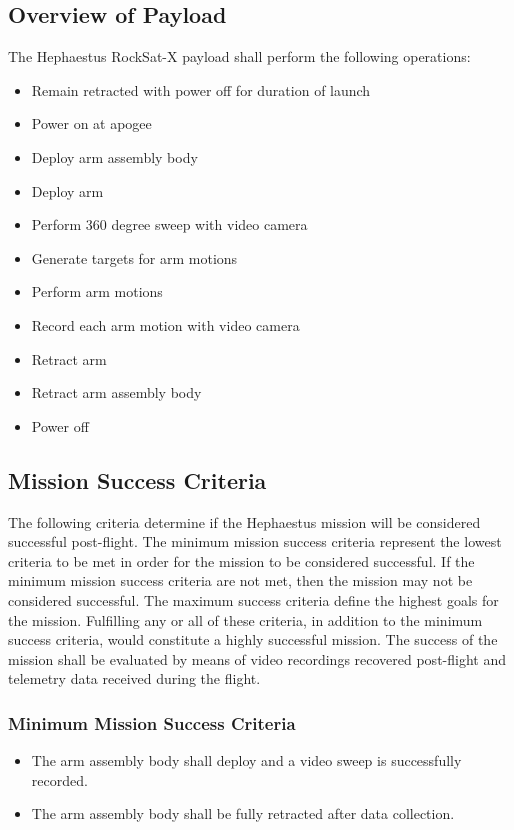 \documentclass[letterpaper,10pt]{article}
\begin{document}
\subsection{Overview of Payload}
The Hephaestus RockSat-X payload shall perform the following operations:
\begin{itemize}
\item{Remain retracted with power off for duration of launch}
\item{Power on at apogee}
\item{Deploy arm assembly body}
\item{Deploy arm}
\item{Perform 360 degree sweep with video camera}
\item{Generate targets for arm motions}
\item{Perform arm motions}
\item{Record each arm motion with video camera}
\item{Retract arm}
\item{Retract arm assembly body}
\item{Power off}
\end{itemize}
\subsection{Mission Success Criteria}
The following criteria determine if the Hephaestus mission will be considered successful post-flight.
The minimum mission success criteria represent the lowest criteria to be met in order for the mission to be considered successful.
If the minimum mission success criteria are not met, then the mission may not be considered successful.
The maximum success criteria define the highest goals for the mission.
Fulfilling any or all of these criteria, in addition to the minimum success criteria, would constitute a highly successful mission.
The success of the mission shall be evaluated by means of video recordings recovered post-flight and telemetry data received during the flight.
\subsubsection{Minimum Mission Success Criteria}
\begin{itemize}
\item{The arm assembly body shall deploy and a video sweep is successfully recorded.}
\item{The arm assembly body shall be fully retracted after data collection.}
\end{itemize}
\end{document}
